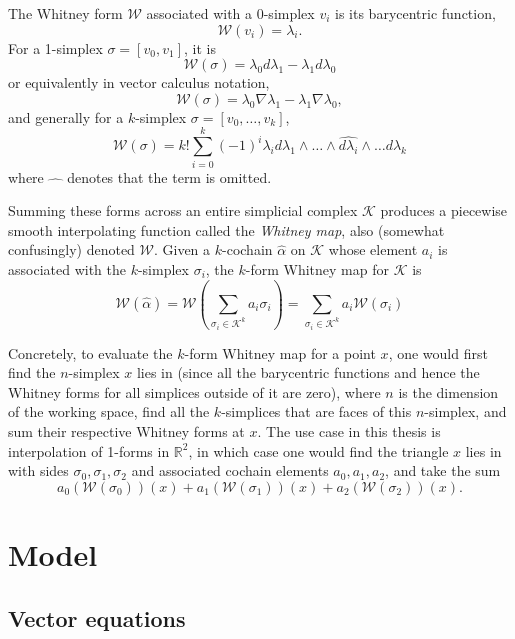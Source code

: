 \documentclass[utf8,english]{gradu3}
\begin{document}
The Whitney form $\mathcal{W}$ associated with a 0-simplex $v_i$
is its barycentric function,
\[
  \mathcal{W}(v_i) = \lambda_i.
\]
For a 1-simplex $\sigma = [v_0,v_1]$, it is
\[
  \mathcal{W}(\sigma) = \lambda_0 d\lambda_1 - \lambda_1 d\lambda_0
\]
or equivalently in vector calculus notation,
\[
  \mathcal{W}(\sigma) = \lambda_0 \nabla\lambda_1 - \lambda_1 \nabla\lambda_0,
\]
and generally for a $k$-simplex $\sigma = [v_0,\dots,v_k]$,
\begin{equation}
  \mathcal{W}(\sigma) = k! \sum_{i=0}^{k} (-1)^i
    \lambda_i d\lambda_1 \wedge \dots \wedge \widehat{d\lambda_i}
    \wedge \dots d\lambda_k
\end{equation}
where $\widehat{\quad}$ denotes that the term is omitted.

Summing these forms across an entire simplicial complex $\mathcal{K}$
produces a piecewise smooth interpolating function called the \textit{Whitney map},
also (somewhat confusingly) denoted $\mathcal{W}$.
Given a $k$-cochain $\hat{\alpha}$ on $\mathcal{K}$ whose element $a_i$
is associated with the $k$-simplex $\sigma_i$,
the $k$-form Whitney map for $\mathcal{K}$ is
\begin{equation}
  \mathcal{W}(\hat{\alpha})
  = \mathcal{W}(\sum_{\sigma_i \in \mathcal{K}^k} a_i\sigma_i)
  = \sum_{\sigma_i \in \mathcal{K}^k} a_i \mathcal{W}(\sigma_i)
\end{equation}

Concretely, to evaluate the $k$-form Whitney map for a point $x$,
one would first find the $n$-simplex $x$ lies in
(since all the barycentric functions and hence the Whitney forms
for all simplices outside of it are zero),
where $n$ is the dimension of the working space,
find all the $k$-simplices that are faces of this $n$-simplex,
and sum their respective Whitney forms at $x$.
The use case in this thesis is interpolation of 1-forms in $\mathbb{R}^2$,
in which case one would find the triangle $x$ lies in
with sides $\sigma_0,\sigma_1,\sigma_2$
and associated cochain elements $a_0,a_1,a_2$,
and take the sum
\[
  a_0 (\mathcal{W}(\sigma_0))(x)
  + a_1 (\mathcal{W}(\sigma_1))(x)
  + a_2 (\mathcal{W}(\sigma_2))(x).
\]


\chapter{Model}\label{sec:dec_model}

\section{Vector equations}
\end{document}
